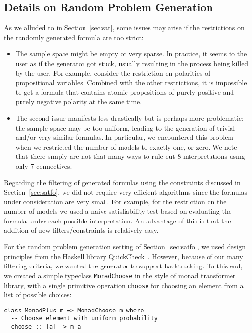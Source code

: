 \subsection{Details on Random Problem Generation}\label{appB:SAT}

As we alluded to in Section~\ref{sec:sat},
some issues may arise if the restrictions on the randomly generated formula are too strict:
\begin{itemize}
    \item
        The sample space might be empty or very sparse.
        In practice, it seems to the user as if the generator got stuck,
        usually resulting in the process being killed by the user. 
        For example,
        consider the restriction on polarities of propositional
        variables. %
        Combined with the other restrictions,
        it is impossible to get a formula that contains atomic propositions
        of purely positive and purely negative polarity at the same time.

    \item
        The second issue manifests less drastically but is perhaps more problematic:
        the sample space may be too uniform,
        leading to the generation of trivial and/or very similar
        formulas. 
        In particular, we encountered this problem
        when we restricted the number of models to exactly one, or zero.
        We note that there simply are not that many ways to rule out 8 interpretations
        using only 7 connectives.
\end{itemize}





Regarding the filtering of generated formulas using the constraints discussed in Section~\ref{sec:satfo},
we did not require very efficient algorithms since
the formulas under consideration are very small.
For example, for the restriction on the number of models we used a naive satisfiability test
based on evaluating the formula under each possible interpretation.
An advantage of this is that the addition of new filters/constraints is relatively easy.




For the random problem generation setting of Section~\ref{sec:satfo},
we used design principles from the Haskell library
QuickCheck~\cite{ClaessenHughes:2000:QuickCheck}.
However, because of our many filtering criteria, we wanted the generator to support backtracking.
To this end,
we created a simple typeclass \texttt{MonadChoose} in the style of monad transformer library,
with a single primitive operation \texttt{choose} for choosing an element from a list of possible choices:
\begin{lstlisting}
class MonadPlus m => MonadChoose m where
  -- Choose element with uniform probability
  choose :: [a] -> m a
\end{lstlisting}

